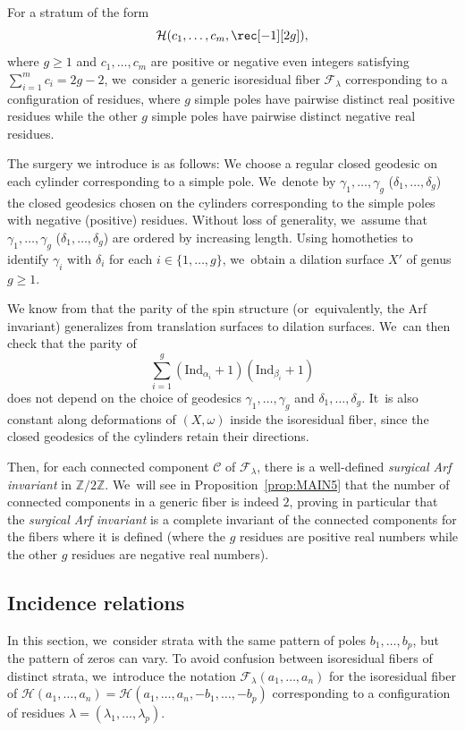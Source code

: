 For a stratum of the form
\[
\mathcal{H}(c_{1},\dots,c_{m},\rec[-1][2g]),
\]
where $g\geq 1$ and $c_{1},\dots,c_{m}$ are positive or negative even integers satisfying $\sum_{i=1}^m c_{i} = 2g-2$, we~consider a generic isoresidual fiber $\mathcal{F}_{\lambda}$ corresponding to a configuration of residues, where $g$ simple poles have pairwise distinct real positive residues while the other $g$ simple poles have pairwise distinct negative real residues.

The surgery we introduce is as follows: We choose a regular closed geodesic on each cylinder corresponding to a simple pole. We~denote by $\gamma_{1},\dots,\gamma_{g}$ (\resp $\delta_{1},\dots,\delta_{g}$) the closed geodesics chosen on the cylinders corresponding to the simple poles with negative (\resp positive) residues. Without loss of generality, we~assume that $\gamma_{1},\dots,\gamma_{g}$ (\resp $\delta_{1},\dots,\delta_{g}$) are ordered by increasing length. Using homotheties to identify $\gamma_{i}$ with $\delta_{i}$ for each $i \in \lbrace{ 1,\dots,g \rbrace}$, we~obtain a dilation surface $X'$ of genus $g \geq 1$.

We know from \cite{ABW,Kawazumi} that the parity of the spin structure (or~equivalently, the Arf invariant) generalizes from translation surfaces to dilation surfaces. We~can then check that the parity of
\[
\sum_{i=1}^{g} (\mathrm{Ind}_{\alpha_{i}}+1)(\mathrm{Ind}_{\beta_{i}}+1)
\]
does not depend on the choice of geodesics $\gamma_{1},\dots,\gamma_{g}$ and $\delta_{1},\dots,\delta_{g}$. It~is also constant along deformations of $(X,\omega)$ inside the isoresidual fiber, since the closed geodesics of the cylinders retain their directions.

Then, for each connected component $\mathcal{C}$ of $\mathcal{F}_{\lambda}$, there is a well-defined \textit{surgical Arf invariant} in $\mathbb{Z}/2\mathbb{Z}$. We~will see in Proposition~\ref{prop:MAIN5} that the number of connected components in a generic fiber is indeed $2$, proving in particular that the \textit{surgical Arf invariant} is a complete invariant of the connected components for the fibers where it is defined (where the $g$ residues are positive real numbers while the other $g$ residues are negative real numbers).

\subsection{Incidence relations}\label{sub:Incidence}

In this section, we~consider strata with the same pattern of poles $b_{1},\dots,b_{p}$, but the pattern of zeros can vary. To avoid confusion between isoresidual fibers of distinct strata, we~introduce the notation $\mathcal{F}_{\lambda}(a_{1},\dots,a_{n})$ for the isoresidual fiber of $\mathcal{H}(a_{1},\dots,a_{n}) =
\mathcal{H}(a_{1},\dots,a_{n}, -b_1,\ldots, -b_p)$ corresponding to a configuration of residues $\lambda=(\lambda_{1},\dots,\lambda_{p})$.

